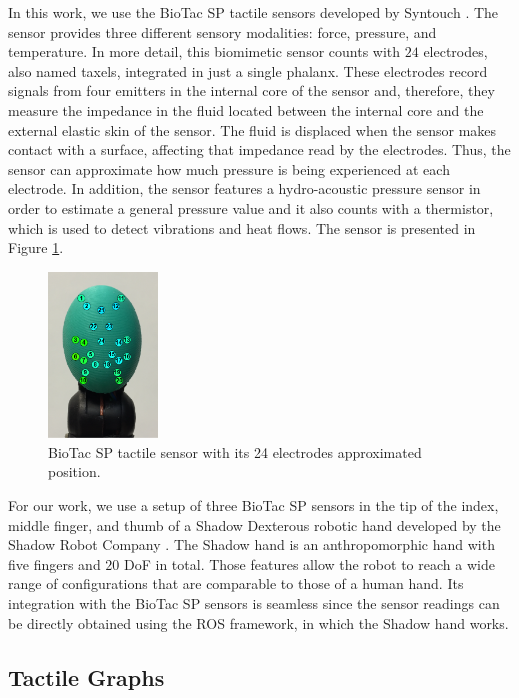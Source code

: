In this work, we use the BioTac SP tactile sensors developed by Syntouch \cite{Syntouch2018}. The sensor provides three different sensory modalities: force, pressure, and temperature. In more detail, this biomimetic sensor counts with $24$ electrodes, also named taxels, integrated in just a single phalanx. These electrodes record signals from four emitters in the internal core of the sensor and, therefore, they measure the impedance in the fluid located between the internal core and the external elastic skin of the sensor. The fluid is displaced when the sensor makes contact with a surface, affecting that impedance read by the electrodes. Thus, the sensor can approximate how much pressure is being experienced at each electrode. In addition, the sensor features a hydro-acoustic pressure sensor in order to estimate a general pressure value and it also counts with a thermistor, which is used to detect vibrations and heat flows. The sensor is presented in Figure \ref{fig:biotac-sensor}.

\begin{figure}[!htb]
	\centering
	\includegraphics[width = 0.26\textwidth, clip = true, trim = 0 75 0 20]{Figures/Tactile/biotac-sensor.png}
	\caption{BioTac SP tactile sensor with its 24 electrodes approximated position.}
	\label{fig:biotac-sensor}
\end{figure}

For our work, we use a setup of three BioTac SP sensors in the tip of the index, middle finger, and thumb of a Shadow Dexterous robotic hand developed by the Shadow Robot Company \cite{ShadowRobotCompany2018}. The Shadow hand is an anthropomorphic hand with five fingers and $20$ \ac{DoF} in total. Those features allow the robot to reach a wide range of configurations that are comparable to those of a human hand. Its integration with the BioTac SP sensors is seamless since the sensor readings can be directly obtained using the \ac{ROS} \cite{Quigley2009} framework, in which the Shadow hand works.

\subsection{Tactile Graphs}
\label{cha:tactile:sec:tactilegcn:subsec:tactile-graphs}

